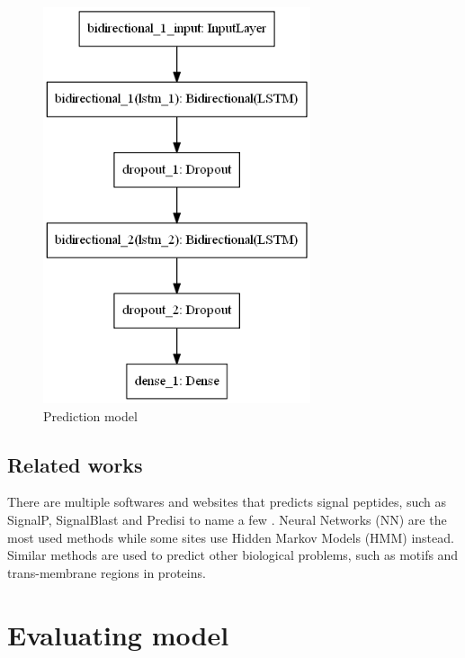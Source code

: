 \begin{figure}[H]
\centering
\includegraphics[width=0.7\textwidth]{pictures/model.png}
\caption{\label{fig:model_fig}Prediction model}
\end{figure}


\subsection{Related works}

There are multiple softwares and websites that predicts signal peptides, such as SignalP, SignalBlast and Predisi to name a few \cite{sp_predict1} \cite{sp_predict2} \cite{sp_predict3}. Neural Networks (NN) are the most used methods while some sites use Hidden Markov Models (HMM) instead. Similar methods are used to predict other biological problems, such as motifs and trans-membrane regions in proteins.


\section{Evaluating model}

